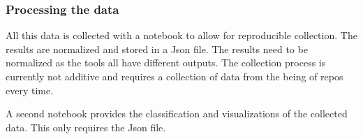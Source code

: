 \subsubsection{Processing the data}
All this data is collected with a notebook to allow for reproducible collection.
The results are normalized and stored in a Json file.
The results need to be normalized as the \cc tools all have different outputs.
The collection process is currently not additive and requires a collection of data from the being of repos every time.

A second notebook provides the classification and visualizations of the collected data.
This only requires the Json file.


